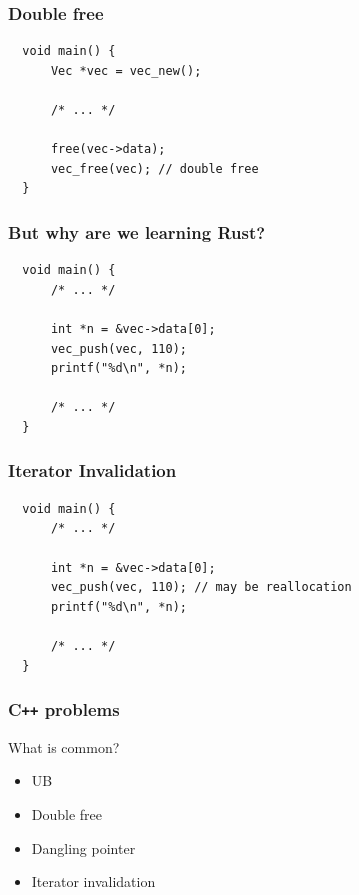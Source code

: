 \documentclass[aspectratio=1610,t]{beamer}
\begin{document}

\begin{frame}[fragile]
\frametitle{Double free}

\begin{verbatim}
  void main() {
      Vec *vec = vec_new();

      /* ... */

      free(vec->data);
      vec_free(vec); // double free
  }
\end{verbatim}

\end{frame}


\begin{frame}[fragile]
\frametitle{But why are we learning Rust?}

\begin{verbatim}
  void main() {
      /* ... */

      int *n = &vec->data[0];
      vec_push(vec, 110);
      printf("%d\n", *n);

      /* ... */
  }
\end{verbatim}

\end{frame}


\begin{frame}[fragile]
\frametitle{Iterator Invalidation}

\begin{verbatim}
  void main() {
      /* ... */

      int *n = &vec->data[0];
      vec_push(vec, 110); // may be reallocation
      printf("%d\n", *n);

      /* ... */
  }
\end{verbatim}

\end{frame}


\begin{frame}[c]
\frametitle{C\texttt{++} problems}
What is common?
\begin{itemize}
    \item UB
    \item Double free
    \item Dangling pointer
    \item Iterator invalidation
\end{itemize}
\end{frame}
\end{document}
